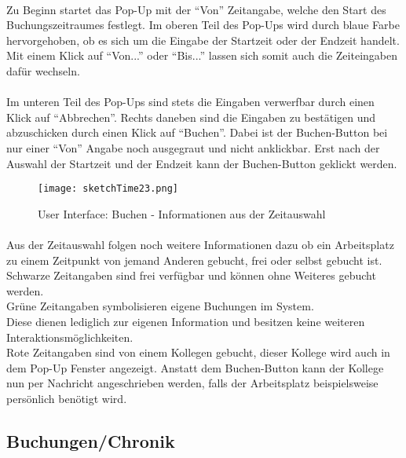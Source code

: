 \paragraph{} Zu Beginn startet das Pop-Up mit der "`Von"' Zeitangabe, welche den Start des Buchungszeitraumes festlegt. 
Im oberen Teil des Pop-Ups wird durch blaue Farbe hervorgehoben, ob es sich um die Eingabe der Startzeit oder der Endzeit handelt.
Mit einem Klick auf "`Von..."' oder "`Bis..."' lassen sich somit auch die Zeiteingaben dafür wechseln. 

\paragraph{}Im unteren Teil des Pop-Ups sind stets die Eingaben verwerfbar durch einen Klick auf "`Abbrechen"'.
Rechts daneben sind die Eingaben zu bestätigen und abzuschicken durch einen Klick auf "`Buchen"'.
Dabei ist der Buchen-Button bei nur einer "`Von"' Angabe noch ausgegraut und nicht anklickbar.
Erst nach der Auswahl der Startzeit und der Endzeit kann der Buchen-Button geklickt werden.

\begin{figure}[!h]
  \centering
  \texttt{[image: sketchTime23.png]}
  \caption{User Interface: Buchen - Informationen aus der Zeitauswahl}
  \label{fig:sketch_time_23}
\end{figure}

\paragraph{}Aus der Zeitauswahl folgen noch weitere Informationen dazu ob ein Arbeitsplatz zu einem Zeitpunkt von jemand Anderen gebucht, frei oder selbst gebucht ist. \\
Schwarze Zeitangaben sind frei verfügbar und können ohne Weiteres gebucht werden. \\
Grüne Zeitangaben symbolisieren eigene Buchungen im System. \\
Diese dienen lediglich zur eigenen Information und besitzen keine weiteren Interaktionsmöglichkeiten.\\
Rote Zeitangaben sind von einem Kollegen gebucht, dieser Kollege wird auch in dem Pop-Up Fenster angezeigt.
Anstatt dem Buchen-Button kann der Kollege nun per Nachricht angeschrieben werden, falls der Arbeitsplatz beispielsweise persönlich benötigt wird. 

\subsection{Buchungen/Chronik}

